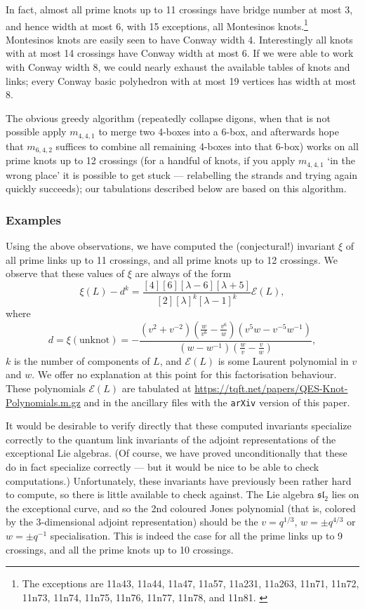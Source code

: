 \documentclass[12pt]{amsart}
\begin{document}
In fact, almost all prime knots up to 11 crossings have bridge number 
at most 3, and hence width at most 6, with 15 exceptions, all Montesinos
knots.\footnote{The exceptions are 11a43, 11a44, 11a47, 11a57, 11a231,
  11a263, 11n71, 11n72, 11n73, 11n74, 11n75, 11n76, 11n77, 11n78, and
  11n81. \cite{1208.4233}}
Montesinos knots are easily seen to have Conway width 4.
Interestingly all knots with at most 14 crossings have Conway width at most 6.
If we were able to work with Conway width 8, we could nearly exhaust the 
available tables of knots and links; every Conway basic polyhedron with at 
most 19 vertices has width at most 8.

The obvious greedy algorithm (repeatedly collapse digons, when that is not
possible apply $m_{4,4,1}$ to merge two 4-boxes into a 6-box, and afterwards
hope that $m_{6,4,2}$  suffices to combine all remaining 4-boxes into that
6-box) works on all prime knots up to 12 crossings (for a handful of knots,
if you apply $m_{4,4,1}$ `in the wrong place' it is possible to get stuck ---
relabelling the strands and trying again quickly succeeds);
our tabulations described below are based on this algorithm.

\subsubsection{Examples}
Using the above observations, we have computed the (conjectural!) 
invariant $\xi$ of all prime links up to 11 crossings, and all prime knots up
to 12 crossings. We observe that these values of $\xi$ are always of the form
$$\xi(L) - d^{k} = 
\frac{[4][6][\lambda-6][\lambda+5]}{[2][\lambda]^k [\lambda-1]^k} \mathcal E(L),$$
where 
$$d = \xi(\textrm{unknot}) = 
-\frac{\left(v^2+v^{-2}\right) \left(\frac{w}{v^6}-\frac{v^6}{w}\right) \left(v^5 w-v^{-5} w^{-1}\right)}{\left(w-w^{-1}\right)
   \left(\frac{w}{v}-\frac{v}{w}\right)},$$ $k$ is the number of components of $L$, 
and $\mathcal E(L)$ is some Laurent polynomial
in $v$ and $w$. We offer no explanation at this point for this factorisation behaviour.
These polynomials $\mathcal E (L)$ are tabulated
at \url{https://tqft.net/papers/QES-Knot-Polynomials.m.gz} and in the ancillary files
with the {\tt arXiv} version of this paper.

It would be desirable to verify directly that these computed invariants specialize 
correctly to the quantum link invariants of the adjoint representations of the
exceptional Lie algebras. (Of course, we have proved unconditionally 
that these do in fact
specialize correctly --- but it would be nice to be able to check computations.)
Unfortunately, these invariants have previously been
rather hard to compute, so there is little available to check against. The Lie
algebra $\mathfrak{sl}_2$ lies on the exceptional curve, and so the 2nd
coloured Jones polynomial  (that is, colored by the 3-dimensional adjoint
representation) should be the $v=q^{1/3}$, $w=\pm q^{4/3}$ or $w=\pm q^{-1}$ specialisation. This is
indeed the case for all the prime links up to 9 crossings, and all the prime knots up to 10 crossings. 
\end{document}
